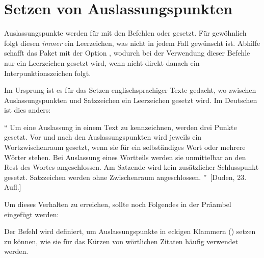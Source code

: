 \section{%
  Setzen von Auslassungspunkten%
  \label{sec:tips:dots}%
}
%
%
Auslassungspunkte werden für  mit den Befehlen  oder 
 gesetzt. Für gewöhnlich folgt diesen \emph{immer} ein 
Leerzeichen, was nicht in jedem Fall gewünscht ist. Abhilfe schafft das Paket 
 mit der Option , wodurch bei der Verwendung 
dieser Befehle nur ein Leerzeichen gesetzt wird, wenn nicht direkt danach ein 
Interpunktionszeichen folgt.
%
\begin{quoting}
\begin{Code}
\usepackage[xspace]{ellipsis}
\end{Code}
\end{quoting}
%
Im Ursprung ist es für das Setzen englischsprachiger Texte gedacht, wo zwischen 
Auslassungspunkten und Satzzeichen ein Leerzeichen gesetzt wird. Im Deutschen 
ist dies anders:
%
\begin{quoting}
\enquote{%
  Um eine Auslassung in einem Text zu kennzeichnen, werden drei Punkte gesetzt. 
  Vor und nach den Auslassungspunkten wird jeweils ein Wortzwischenraum 
  gesetzt, wenn sie für ein selbständiges Wort oder mehrere Wörter stehen. Bei 
  Auslassung eines Wortteils werden sie unmittelbar an den Rest des Wortes 
  angeschlossen. Am Satzende wird kein zusätzlicher Schlusspunkt gesetzt. 
  Satzzeichen werden ohne Zwischenraum angeschlossen.%
}~[Duden, 23. Aufl.]
\end{quoting} 
%
Um dieses Verhalten zu erreichen, sollte noch Folgendes in der Präambel 
eingefügt werden:
%
\begin{quoting}
\begin{Code}
\let\ellipsispunctuation\relax
\newcommand*{\qdots}{[\dots{}]\xspace}
\end{Code}
\end{quoting}
%
Der Befehl  wird definiert, um Auslassungspunkte in eckigen 
Klammern (\OPValue{\dots}) setzen zu können, wie sie für das Kürzen von 
wörtlichen Zitaten häufig verwendet werden.



